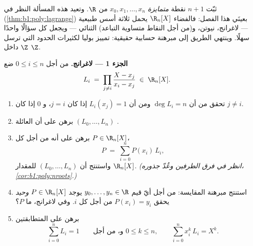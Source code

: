 \begin{problem}\label{pb:b1:vspaces:1}
ثبّت $n + 1$ نقطة \emph{متمايزة} $x_0, x_1, \dots, x_n$ من $\R$.
وتعيد هذه المسألة النظر في 
(\cref{thm:b1:poly:lagrange}) بعينَي هذا الفصل: فالفضاء
$\R_n[X]$ يحمل ثلاثة أسس طبيعية ---  لاغرانج،
 نيوتن، و(من أجل النقاط متساوية التباعد)  الثنائي ---
ويجعل كل  سؤالًا واحدًا سهلًا. وينتهي الطريق إلى مبرهنة
حسابية حقيقية: تمييز بوليا لكثيرات الحدود
التي ترسل $\Z$ داخل $\Z$.

\medskip
\noindent\textbf{الجزء 1 ---  لاغرانج.} من أجل $0 \leq i
\leq n$ ضع
\[
L_i \;=\; \prod_{j \neq i} \frac{X - x_j}{x_i - x_j} \;\in\;
\R_n[X].
\]
\begin{enumerate}
  \item تحقق من أن $\deg L_i = n$ ومن أن $L_i(x_j) = 1$ إذا كان $j =
        i$، و $0$ إذا كان $j \neq i$.
  \item برهن على أن العائلة $(L_0, \dots, L_n)$ .
  \item برهن على أنه من أجل كل $P \in \R_n[X]$،
        \[
        P \;=\; \sum_{i=0}^{n} P(x_i)\, L_i ,
        \]
        واستنتج أن $(L_0, \dots, L_n)$  للمقدار
        $\R_n[X]$. \emph{(انظر في فرق الطرفين
        وعُدّ جذوره، \cref{cor:b1:poly:nroots}.)}
  \item استنتج مبرهنة المقايسة: من أجل أيّ قيم $y_0,
        \dots, y_n \in \R$ يوجد $P \in
        \R_n[X]$ \emph{وحيد} يحقق $P(x_i) = y_i$ من أجل كل $i$. وفي 
        لاغرانج، ما   $P$؟
  \item برهن على المتطابقتين
        \[
        \sum_{i=0}^{n} L_i = 1
        \qquad\text{و، من أجل } 0 \leq k \leq n,\qquad
        \sum_{i=0}^{n} x_i^{k}\, L_i = X^{k} .
        \]
\end{enumerate}


\end{problem}
